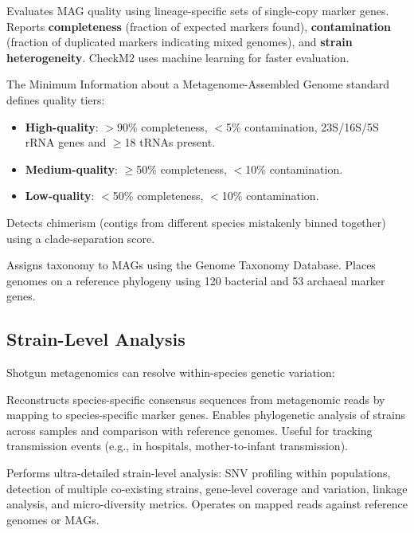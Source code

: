 \begin{description}[style=nextline]
  \item[CheckM / CheckM2] Evaluates MAG quality using lineage-specific sets of single-copy marker genes. Reports \textbf{completeness} (fraction of expected markers found), \textbf{contamination} (fraction of duplicated markers indicating mixed genomes), and \textbf{strain heterogeneity}. CheckM2 uses machine learning for faster evaluation.
  \item[MIMAG standards] The Minimum Information about a Metagenome-Assembled Genome standard defines quality tiers:
    \begin{itemize}[nosep]
      \item \textbf{High-quality}: $>$90\% completeness, $<$5\% contamination, 23S/16S/5S rRNA genes and $\geq$18 tRNAs present.
      \item \textbf{Medium-quality}: $\geq$50\% completeness, $<$10\% contamination.
      \item \textbf{Low-quality}: $<$50\% completeness, $<$10\% contamination.
    \end{itemize}
  \item[GUNC] Detects chimerism (contigs from different species mistakenly binned together) using a clade-separation score.
  \item[GTDB-Tk] Assigns taxonomy to MAGs using the Genome Taxonomy Database. Places genomes on a reference phylogeny using 120 bacterial and 53 archaeal marker genes.
\end{description}

\subsection{Strain-Level Analysis}

Shotgun metagenomics can resolve within-species genetic variation:

\begin{description}[style=nextline]
  \item[StrainPhlAn 4] Reconstructs species-specific consensus sequences from metagenomic reads by mapping to species-specific marker genes. Enables phylogenetic analysis of strains across samples and comparison with reference genomes. Useful for tracking transmission events (e.g.,  in hospitals, mother-to-infant transmission).
  \item[inStrain] Performs ultra-detailed strain-level analysis: SNV profiling within populations, detection of multiple co-existing strains, gene-level coverage and variation, linkage analysis, and micro-diversity metrics. Operates on mapped reads against reference genomes or MAGs.
\end{description}

